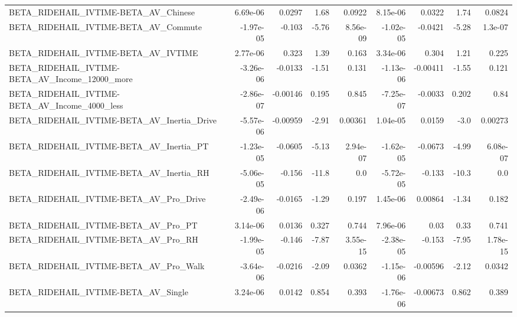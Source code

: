 \begin{tabular}{lrrrrrrrr}
BETA\_RIDEHAIL\_IVTIME-BETA\_AV\_Chinese               &    6.69e-06 &       0.0297 &     1.68 &   0.0922 &   8.15e-06 &      0.0322 &         1.74 &        0.0824 \\
BETA\_RIDEHAIL\_IVTIME-BETA\_AV\_Commute               &   -1.97e-05 &       -0.103 &    -5.76 & 8.56e-09 &  -1.02e-05 &     -0.0421 &        -5.28 &       1.3e-07 \\
BETA\_RIDEHAIL\_IVTIME-BETA\_AV\_IVTIME                &    2.77e-06 &        0.323 &     1.39 &    0.163 &   3.34e-06 &       0.304 &         1.21 &         0.225 \\
BETA\_RIDEHAIL\_IVTIME-BETA\_AV\_Income\_12000\_more     &   -3.26e-06 &      -0.0133 &    -1.51 &    0.131 &  -1.13e-06 &    -0.00411 &        -1.55 &         0.121 \\
BETA\_RIDEHAIL\_IVTIME-BETA\_AV\_Income\_4000\_less      &   -2.86e-07 &     -0.00146 &    0.195 &    0.845 &  -7.25e-07 &     -0.0033 &        0.202 &          0.84 \\
BETA\_RIDEHAIL\_IVTIME-BETA\_AV\_Inertia\_Drive         &   -5.57e-06 &     -0.00959 &    -2.91 &  0.00361 &   1.04e-05 &      0.0159 &         -3.0 &       0.00273 \\
BETA\_RIDEHAIL\_IVTIME-BETA\_AV\_Inertia\_PT            &   -1.23e-05 &      -0.0605 &    -5.13 & 2.94e-07 &  -1.62e-05 &     -0.0673 &        -4.99 &      6.08e-07 \\
BETA\_RIDEHAIL\_IVTIME-BETA\_AV\_Inertia\_RH            &   -5.06e-05 &       -0.156 &    -11.8 &      0.0 &  -5.72e-05 &      -0.133 &        -10.3 &           0.0 \\
BETA\_RIDEHAIL\_IVTIME-BETA\_AV\_Pro\_Drive             &   -2.49e-06 &      -0.0165 &    -1.29 &    0.197 &   1.45e-06 &     0.00864 &        -1.34 &         0.182 \\
BETA\_RIDEHAIL\_IVTIME-BETA\_AV\_Pro\_PT                &    3.14e-06 &       0.0136 &    0.327 &    0.744 &   7.96e-06 &        0.03 &         0.33 &         0.741 \\
BETA\_RIDEHAIL\_IVTIME-BETA\_AV\_Pro\_RH                &   -1.99e-05 &       -0.146 &    -7.87 & 3.55e-15 &  -2.38e-05 &      -0.153 &        -7.95 &      1.78e-15 \\
BETA\_RIDEHAIL\_IVTIME-BETA\_AV\_Pro\_Walk              &   -3.64e-06 &      -0.0216 &    -2.09 &   0.0362 &  -1.15e-06 &    -0.00596 &        -2.12 &        0.0342 \\
BETA\_RIDEHAIL\_IVTIME-BETA\_AV\_Single                &    3.24e-06 &       0.0142 &    0.854 &    0.393 &  -1.76e-06 &    -0.00673 &        0.862 &         0.389 \\

\end{tabular}
